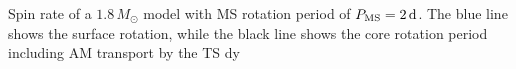  \label{fig:MRI1.8rot} Spin rate of a $1.8 \, M_\odot$ model with MS rotation period of $P_{\rm MS} = 2 \, {\rm d}$. The blue line shows the surface rotation, while the black line shows the core rotation period including AM transport by the TS dy